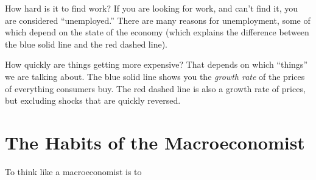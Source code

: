 \documentclass[
  letterpaper,
  DIV=11,
  numbers=noendperiod]{scrreprt}
\begin{document}
\begin{figure}

\centering{

}

\caption{\label{fig-realgdp-potgpd}}

\end{figure}%

How hard is it to find work? If you are looking for work, and can't find
it, you are considered ``unemployed.'' There are many reasons for
unemployment, some of which depend on the state of the economy (which
explains the difference between the blue solid line and the red dashed
line).

\begin{figure}

\centering{

}

\caption{\label{fig-unrate-nrou}}

\end{figure}%

How quickly are things getting more expensive? That depends on which
``things'' we are talking about. The blue solid line shows you the
\emph{growth rate} of the prices of everything consumers buy. The red
dashed line is also a growth rate of prices, but excluding shocks that
are quickly reversed.

\begin{figure}

\centering{

}

\caption{\label{fig-pcepi-pcepilfe}}

\end{figure}%

\section{The Habits of the
Macroeconomist}\label{the-habits-of-the-macroeconomist}

To think like a macroeconomist is to
\end{document}
